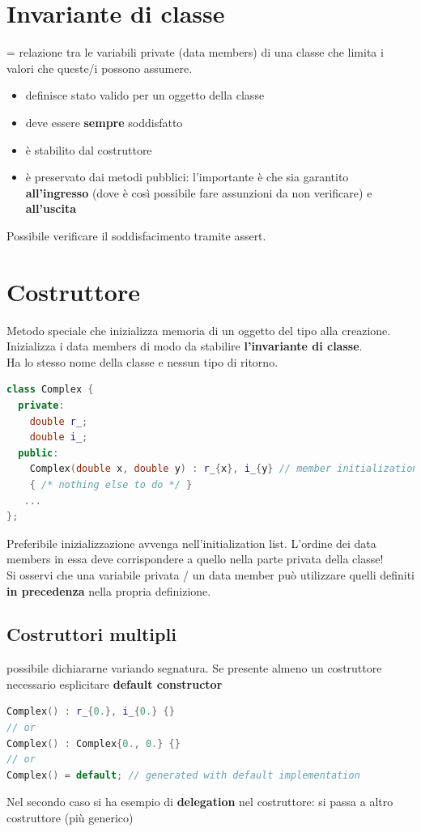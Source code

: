 \documentclass[10pt, oneside]{book}
\begin{document}
\section{Invariante di classe}
= relazione tra le variabili private (data members) di una classe che limita i valori che queste/i possono assumere.
\begin{itemize}
\item definisce stato valido per un oggetto della classe
\item deve essere \textbf{sempre} soddisfatto
\item è stabilito dal costruttore
\item è preservato dai metodi pubblici: l'importante è che sia garantito \textbf{all'ingresso} (dove è così possibile fare assunzioni da non verificare) e \textbf{all'uscita}
\end{itemize}
Possibile verificare il soddisfacimento tramite assert.

\section{Costruttore}
Metodo speciale che inizializza memoria di un oggetto del tipo alla creazione. Inizializza i data members di modo da stabilire \textbf{l'invariante di classe}.\\
Ha lo stesso nome della classe e nessun tipo di ritorno.
\begin{lstlisting}[language=C++]
class Complex {
  private:
    double r_;
    double i_;
  public:
    Complex(double x, double y) : r_{x}, i_{y} // member initialization list
    { /* nothing else to do */ }
   ...
};
\end{lstlisting}
Preferibile inizializzazione avvenga nell'initialization list. L'ordine dei data members in essa deve corrispondere a quello nella parte privata della classe!\\
Si osservi che una variabile privata / un data member può utilizzare quelli definiti \textbf{in precedenza} nella propria definizione.

\subsection{Costruttori multipli} possibile dichiararne variando segnatura. Se presente almeno un costruttore necessario esplicitare \textbf{default constructor}
\begin{lstlisting}[language=C++]
Complex() : r_{0.}, i_{0.} {}
// or
Complex() : Complex{0., 0.} {}
// or
Complex() = default; // generated with default implementation 
\end{lstlisting}
Nel secondo caso si ha esempio di \textbf{delegation} nel costruttore: si passa a altro costruttore (più generico)
\end{document}
